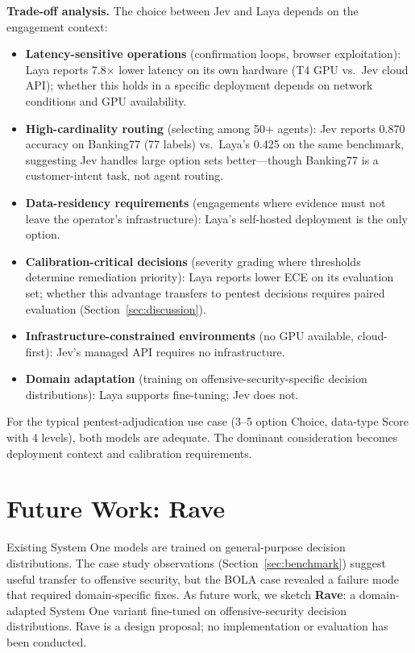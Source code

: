 \documentclass[conference]{IEEEtran}
\begin{document}
\textbf{Trade-off analysis.} The choice between Jev and Laya depends on the engagement context:

\begin{itemize}[leftmargin=*]
\item \textbf{Latency-sensitive operations} (confirmation loops, browser exploitation): Laya reports 7.8$\times$ lower latency on its own hardware (T4 GPU vs.\ Jev cloud API); whether this holds in a specific deployment depends on network conditions and GPU availability.
\item \textbf{High-cardinality routing} (selecting among 50+ agents): Jev reports 0.870 accuracy on Banking77 (77 labels) vs.\ Laya's 0.425 on the same benchmark, suggesting Jev handles large option sets better---though Banking77 is a customer-intent task, not agent routing.
\item \textbf{Data-residency requirements} (engagements where evidence must not leave the operator's infrastructure): Laya's self-hosted deployment is the only option.
\item \textbf{Calibration-critical decisions} (severity grading where thresholds determine remediation priority): Laya reports lower ECE on its evaluation set; whether this advantage transfers to pentest decisions requires paired evaluation (Section~\ref{sec:discussion}).
\item \textbf{Infrastructure-constrained environments} (no GPU available, cloud-first): Jev's managed API requires no infrastructure.
\item \textbf{Domain adaptation} (training on offensive-security-specific decision distributions): Laya supports fine-tuning; Jev does not.
\end{itemize}

For the typical pentest-adjudication use case (3--5 option Choice, data-type Score with 4 levels), both models are adequate. The dominant consideration becomes deployment context and calibration requirements.

\section{Future Work: Rave}\label{sec:proposal}

Existing System One models are trained on general-purpose decision distributions. The case study observations (Section~\ref{sec:benchmark}) suggest useful transfer to offensive security, but the BOLA case revealed a failure mode that required domain-specific fixes. As future work, we sketch \textbf{Rave}: a domain-adapted System One variant fine-tuned on offensive-security decision distributions. Rave is a design proposal; no implementation or evaluation has been conducted.
\end{document}
